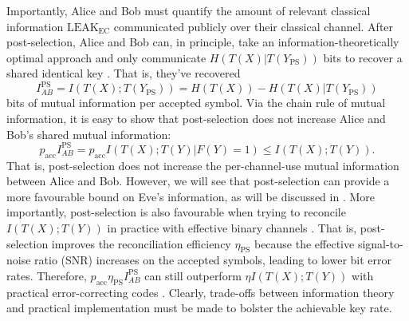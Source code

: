 ﻿\documentclass[12pt]{article}
\begin{document}
Importantly, Alice and Bob must quantify the amount of relevant classical information $\text{LEAK}_{\text{EC}}$ communicated publicly over their classical channel. After post-selection, Alice and Bob can, in principle, take an information-theoretically optimal approach and only communicate $H(T(X)|T(Y_\text{PS}))$ bits to recover a shared identical key \cite{VanAssche-2004, Slepian-1973}. That is, they've recovered 
\begin{equation}
  \label{eq: I AB PS}
I_{AB}^\text{PS} = I(T(X); T(Y_\text{PS})) = H(T(X)) - H(T(X)|T(Y_\text{PS}))
\end{equation}
bits of mutual information per accepted symbol. Via the chain rule of mutual information, it is easy to show that post-selection does not increase Alice and Bob's shared mutual information:
\begin{equation}
  \label{eq: MI proof}
  p_\text{acc} I_{AB}^\text{PS} = p_\text{acc} I(T(X); T(Y) | F(Y) = 1) \leq I(T(X);T(Y)).
\end{equation}
That is, post-selection does not increase the per-channel-use mutual information between Alice and Bob. However, we will see that post-selection can provide a more favourable bound on Eve's information, as will be discussed in . More importantly, post-selection is also favourable when trying to reconcile $I(T(X); T(Y))$ in practice with effective binary channels \cite{Heid-2007, Silberhorn-2002}. That is, post-selection improves the reconciliation efficiency $\eta_\text{PS}$ because the effective signal-to-noise ratio (SNR) increases on the accepted symbols, leading to lower bit error rates. Therefore, $p_\text{acc}\eta_\text{PS} I_{AB}^\text{PS}$ can still outperform $\eta I(T(X); T(Y))$ with practical error-correcting codes \cite{Weerasinghe-2023}. Clearly, trade-offs between information theory and practical implementation must be made to bolster the achievable key rate.
\end{document}
